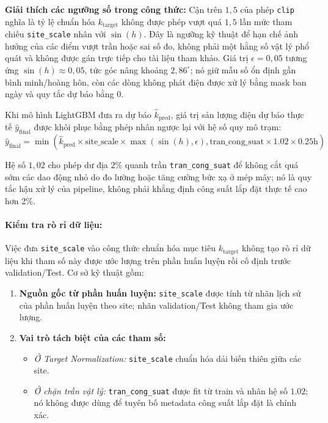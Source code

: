 \documentclass[12pt,a4paper]{article}
\begin{document}
\textbf{Giải thích các ngưỡng số trong công thức:} Cận trên $1{,}5$ của phép \texttt{clip} nghĩa là tỷ lệ chuẩn hóa $k_{\text{target}}$ không được phép vượt quá $1{,}5$ lần mức tham chiếu \texttt{site\_scale} nhân với $\sin(h)$. Đây là ngưỡng kỹ thuật để hạn chế ảnh hưởng của các điểm vượt trần hoặc sai số đo, không phải một hằng số vật lý phổ quát và không được gán trực tiếp cho tài liệu tham khảo. Giá trị $\epsilon=0{,}05$ tương ứng $\sin(h)\approx0{,}05$, tức góc nâng khoảng $2{,}86^\circ$; nó giữ mẫu số ổn định gần bình minh/hoàng hôn, còn các dòng không phát điện được xử lý bằng mask ban ngày và quy tắc dự báo bằng 0.

Khi mô hình LightGBM đưa ra dự báo $\hat{k}_{\text{pred}}$, giá trị sản lượng điện dự báo thực tế $\hat{y}_{\text{final}}$ được khôi phục bằng phép nhân ngược lại với hệ số quy mô trạm:
\begin{equation}
    \hat{y}_{\text{final}} = \min\left(\hat{k}_{\text{pred}} \times \text{site\_scale} \times \max(\sin(h), \epsilon), \text{tran\_cong\_suat} \times 1.02 \times 0.25\text{h}\right)
\end{equation}

Hệ số $1{,}02$ cho phép dư địa $2\%$ quanh trần \texttt{tran\_cong\_suat} để không cắt quá sớm các dao động nhỏ do đo lường hoặc tăng cường bức xạ ở mép mây; nó là quy tắc hậu xử lý của pipeline, không phải khẳng định công suất lắp đặt thực tế cao hơn 2\%.

\paragraph{Kiểm tra rò rỉ dữ liệu:}
Việc đưa \texttt{site\_scale} vào công thức chuẩn hóa mục tiêu $k_{\text{target}}$ không tạo rò rỉ dữ liệu khi tham số này được ước lượng trên phần huấn luyện rồi cố định trước validation/Test. Cơ sở kỹ thuật gồm:
\begin{enumerate}
    \item \textbf{Nguồn gốc từ phần huấn luyện:} \texttt{site\_scale} được tính từ nhãn lịch sử của phần huấn luyện theo site; nhãn validation/Test không tham gia ước lượng.
    \item \textbf{Vai trò tách biệt của các tham số:}
    \begin{itemize}
        \item \textit{Ở Target Normalization:} \texttt{site\_scale} chuẩn hóa dải biến thiên giữa các site.
        \item \textit{Ở chặn trần vật lý:} \texttt{tran\_cong\_suat} được fit từ train và nhân hệ số $1.02$; nó không được dùng để tuyên bố metadata công suất lắp đặt là chính xác.
    \end{itemize}
\end{enumerate}
\end{document}
